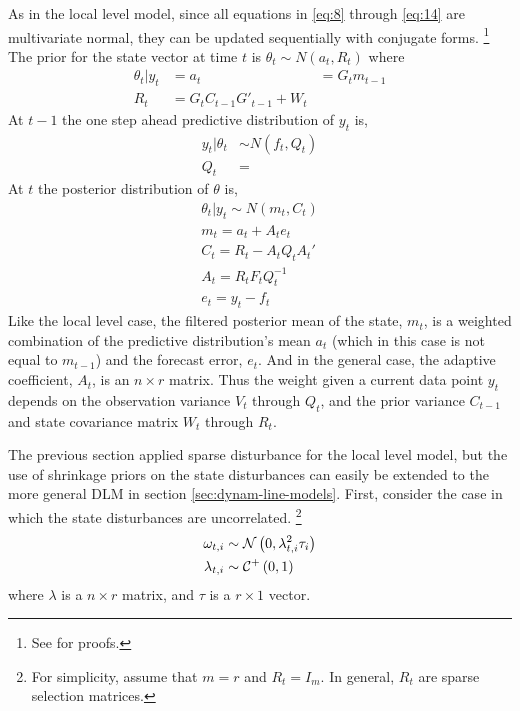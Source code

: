 \documentclass{article}
\begin{document}
As in the local level model, since all equations in \eqref{eq:8} through \eqref{eq:14} are multivariate normal, they can be updated sequentially with conjugate forms.%
\footnote{See \textcite[Section 4.3][]{WestHarrison1997} for proofs.}
The prior for the state vector at time $t$ is $\theta_{t} \sim N(a_{t}, R_{t})$ where
\begin{align}
  \label{eq:13}
  \theta_{t} | y_{t} &= 
  a_{t} &= G_{t} m_{t-1} \\
  R_{t} &= G_{t} C_{t-1} G'_{t-1} + W_{t}
\end{align}
At $t-1$ the one step ahead predictive distribution of $y_{t}$ is,
\begin{align}
  \label{eq:13}
  y_{t} | \theta_{t} & \sim N(f_{t}, Q_{t}) \\
  Q_{t} &= 
\end{align}
At $t$ the posterior distribution of $\theta$ is,
\begin{align}
  \label{eq:15}
  \theta_{t} | y_{t} \sim N(m_{t}, C_{t}) \\
  m_{t} = a_{t} + A_{t} e_{t} \\
  C_{t} = R_{t} - A_{t} Q_{t} A_{t}' \\
  A_{t} = R_{t} F_{t} Q^{-1}_{t} \\
  e_{t} = y_{t} - f_{t}
\end{align}
Like the local level case, the filtered posterior mean of the state,
$m_{t}$, is a weighted combination of the predictive distribution's
mean $a_{t}$ (which in this case is not equal to $m_{t-1}$) and the
forecast error, $e_{t}$.
And in the general case, the adaptive coefficient, $A_{t}$, is an $n
\times r$  matrix.
Thus the weight given a current data point $y_{t}$ depends on the
observation variance $V_{t}$ through $Q_{t}$, and the prior variance
$C_{t-1}$ and state covariance matrix $W_{t}$ through $R_{t}$.

The previous section applied sparse disturbance for the local level model, but the use of shrinkage priors on the state disturbances can easily be extended to the more general DLM in section \ref{sec:dynam-line-models}.
First, consider the case in which the state disturbances are uncorrelated.
\footnote{
  For simplicity, assume that $m = r$ and $R_{t} = I_{m}$.
  In general, $R_{t}$ are sparse selection matrices.
}
\begin{equation}
  \label{eq:20}
  \begin{aligned}[t]
    \omega_{t,i} &\sim \mathcal{N}\left(0, \lambda_{t,i}^{2} \tau_{i}\right) \\
    \lambda_{t,i} & \sim \mathcal{C}^{+}\left(0, 1\right)
  \end{aligned}
\end{equation}
where $\lambda$ is a $n \times r$ matrix, and $\tau$ is a $r \times 1$ vector.
\end{document}
